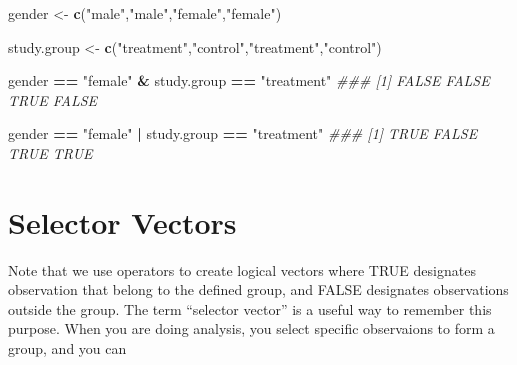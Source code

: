 \documentclass[]{book}
\newenvironment{Shaded}{\begin{snugshade}}{\end{snugshade}}
\newcommand{\CommentTok}[1]{\textcolor[rgb]{0.56,0.35,0.01}{\textit{#1}}}
\newcommand{\KeywordTok}[1]{\textcolor[rgb]{0.13,0.29,0.53}{\textbf{#1}}}
\newcommand{\NormalTok}[1]{#1}
\newcommand{\OperatorTok}[1]{\textcolor[rgb]{0.81,0.36,0.00}{\textbf{#1}}}
\newcommand{\StringTok}[1]{\textcolor[rgb]{0.31,0.60,0.02}{#1}}
\theoremstyle{definition}
\theoremstyle{definition}
\theoremstyle{definition}
\theoremstyle{remark}
\begin{document}
\begin{Shaded}
\begin{Highlighting}[]
\NormalTok{gender <-}\StringTok{ }\KeywordTok{c}\NormalTok{(}\StringTok{"male"}\NormalTok{,}\StringTok{"male"}\NormalTok{,}\StringTok{"female"}\NormalTok{,}\StringTok{"female"}\NormalTok{)}

\NormalTok{study.group <-}\StringTok{ }\KeywordTok{c}\NormalTok{(}\StringTok{"treatment"}\NormalTok{,}\StringTok{"control"}\NormalTok{,}\StringTok{"treatment"}\NormalTok{,}\StringTok{"control"}\NormalTok{)}

\NormalTok{gender }\OperatorTok{==}\StringTok{ "female"}  \OperatorTok{&}\StringTok{  }\NormalTok{study.group }\OperatorTok{==}\StringTok{ "treatment"}
\CommentTok{### [1] FALSE FALSE  TRUE FALSE}

\NormalTok{gender }\OperatorTok{==}\StringTok{ "female"}  \OperatorTok{|}\StringTok{  }\NormalTok{study.group }\OperatorTok{==}\StringTok{ "treatment"}
\CommentTok{### [1]  TRUE FALSE  TRUE  TRUE}
\end{Highlighting}
\end{Shaded}

\hypertarget{selector-vectors}{%
\section{Selector Vectors}\label{selector-vectors}}

Note that we use operators to create logical vectors where TRUE
designates observation that belong to the defined group, and FALSE
designates observations outside the group. The term ``selector vector''
is a useful way to remember this purpose. When you are doing analysis,
you select specific observaions to form a group, and you can
\end{document}
